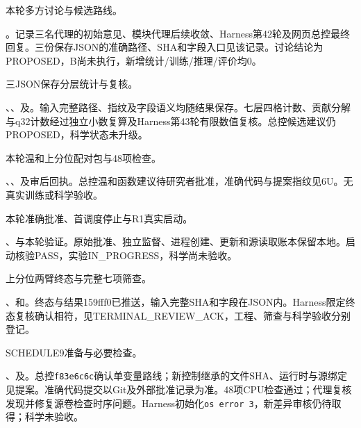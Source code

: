 \documentclass[UTF8,10.5pt,a4paper,fontset=none]{ctexart}
\begin{document}
\begin{description}[leftmargin=2.7em,labelwidth=2.2em,itemsep=0pt]
\item[S32] 本轮多方讨论与候选路线。\par{}。记录三名代理的初始意见、模块代理后续收敛、Harness第42轮及网页总控最终回复。三份保存JSON的准确路径、SHA和字段入口见该记录。讨论结论为PROPOSED，B尚未执行，新增统计/训练/推理/评价均0。
\item[S33] 三JSON保存分层统计与复核。\par{}\par{}、、及。输入完整路径、指纹及字段语义均随结果保存。七层四格计数、贡献分解与q32计数经过独立小数复算及Harness第43轮有限数值复核。总控候选建议仍PROPOSED，科学状态未升级。
\item[S34] 本轮温和上分位配对包与48项检查。\par{}\par{}、、及审后回执。总控温和函数建议待研究者批准，准确代码与提案指纹见6U。无真实训练或科学验收。
\item[S35] 本轮准确批准、首调度停止与R1真实启动。\par{}\par{}、与本轮验证。原始批准、独立监督、进程创建、更新和源读取账本保留本地。启动核验PASS，实验IN\_PROGRESS，科学尚未验收。
\item[S36] 上分位两臂终态与完整七项筛查。\par{}\par{}、和。终态与结果159fff0已推送，输入完整SHA和字段在JSON内。Harness限定终态复核确认相符，见TERMINAL\_REVIEW\_ACK，工程、筛查与科学验收分别登记。
\item[S37] SCHEDULE9准备与必要检查。\par{}\par{}、及。总控\texttt{f83e6c6c}确认单变量路线；新控制继承的文件SHA、运行时与源绑定见提案。准确代码提交以Git及外部批准记录为准。48项CPU检查通过；代理复核发现并修复源卷检查时序问题。Harness初始化\texttt{os error 3}，新差异审核仍待取得；科学未验收。

\end{description}
\end{document}
